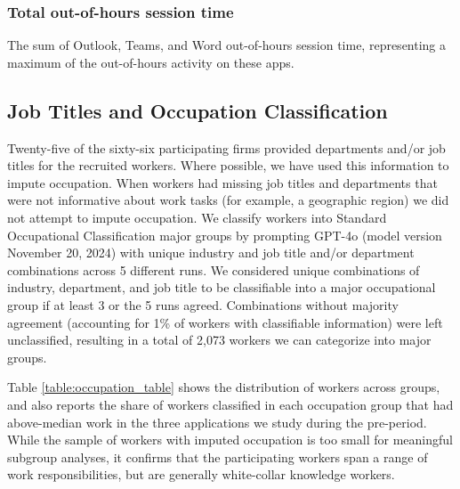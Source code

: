 \documentclass{article}
\begin{document}
 \subsubsection{Total out-of-hours session time} 
 The sum of Outlook, Teams, and Word out-of-hours session time, representing a maximum of the out-of-hours activity on these apps.



\subsection{Job Titles and Occupation Classification} \label{app:jobtitles}

Twenty-five of the sixty-six participating firms provided departments and/or job titles for the recruited workers. Where possible, we have used this information to impute occupation. When workers had missing job titles and departments that were not informative about work tasks (for example, a geographic region) we did not attempt to impute occupation. We classify workers into Standard Occupational Classification major groups by prompting GPT-4o (model version November 20, 2024) with unique industry and job title and/or department combinations across 5 different runs. We considered unique combinations of industry, department, and job title to be classifiable into a major occupational group if at least 3 or the 5 runs agreed. Combinations without majority agreement (accounting for 1\% of workers with classifiable information) were left unclassified, resulting in a total of 2,073 workers we can categorize into major groups. 

Table \ref{table:occupation_table} shows the distribution of workers across groups, and also reports the share of workers classified in each occupation group that had above-median work in the three applications we study during the pre-period. While the sample of workers with imputed occupation is too small for meaningful subgroup analyses, it confirms that the participating workers span a range of work responsibilities, but are generally white-collar knowledge workers.
\end{document}
